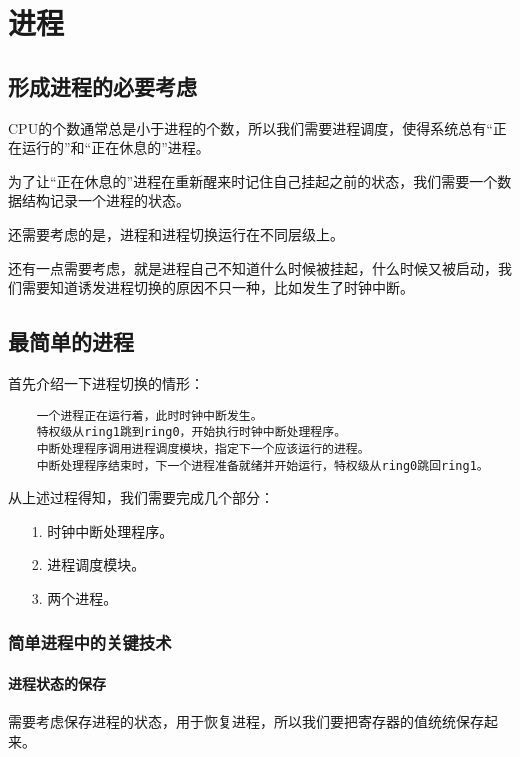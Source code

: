 \documentclass[a4paper,left=2.5cm,right=2.5cm,11pt]{report}
\begin{document}
\tableofcontents

\clearpage

\chapter{进程}
\section{形成进程的必要考虑}
	CPU的个数通常总是小于进程的个数，所以我们需要进程调度，使得系统总有“正在运行的”和“正在休息的”进程。\par

	为了让“正在休息的”进程在重新醒来时记住自己挂起之前的状态，我们需要一个数据结构记录一个进程的状态。\par

	还需要考虑的是，进程和进程切换运行在不同层级上。\par

	还有一点需要考虑，就是进程自己不知道什么时候被挂起，什么时候又被启动，我们需要知道诱发进程切换的原因不只一种，比如发生了时钟中断。

\section{最简单的进程}
	首先介绍一下进程切换的情形：
	\begin{lstlisting}
	一个进程正在运行着，此时时钟中断发生。
	特权级从ring1跳到ring0，开始执行时钟中断处理程序。
	中断处理程序调用进程调度模块，指定下一个应该运行的进程。
	中断处理程序结束时，下一个进程准备就绪并开始运行，特权级从ring0跳回ring1。
	\end{lstlisting}

	从上述过程得知，我们需要完成几个部分：
	\begin{itemize}
		\item[1.] 时钟中断处理程序。
		\item[2.] 进程调度模块。
		\item[3.] 两个进程。
	\end{itemize}

\subsection{简单进程中的关键技术}
\subsubsection{进程状态的保存}
	需要考虑保存进程的状态，用于恢复进程，所以我们要把寄存器的值统统保存起来。\par
	
\end{document}
